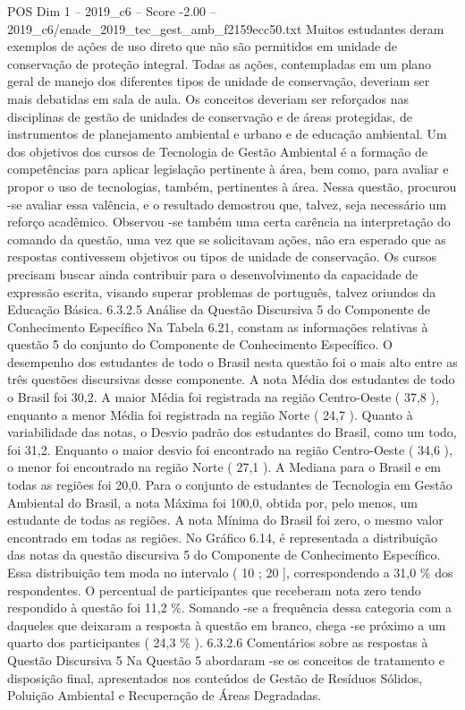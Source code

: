 \begin{textsample}{POS Dim 1 – 2019\_c6 – Score -2.00 – 2019\_c6/enade\_2019\_tec\_gest\_amb\_f2159ecc50.txt}
Muitos estudantes deram exemplos de ações de uso direto que não são permitidos em unidade de conservação de proteção integral.
Todas as ações, contempladas em um plano geral de manejo dos diferentes tipos de unidade de conservação, deveriam ser mais debatidas em sala de aula.
Os conceitos deveriam ser reforçados nas disciplinas de gestão de unidades de conservação e de áreas protegidas, de instrumentos de planejamento ambiental e urbano e de educação ambiental.
Um dos objetivos dos cursos de Tecnologia de Gestão Ambiental é a formação de competências para aplicar legislação pertinente à área, bem como, para avaliar e propor o uso de tecnologias, também, pertinentes à área.
Nessa questão, procurou -se avaliar essa valência, e o resultado demostrou que, talvez, seja necessário um reforço acadêmico.
Observou -se também uma certa carência na interpretação do comando da questão, uma vez que se solicitavam ações, não era esperado que as respostas contivessem objetivos ou tipos de unidade de conservação.
Os cursos precisam buscar ainda contribuir para o desenvolvimento da capacidade de expressão escrita, visando superar problemas de português, talvez oriundos da Educação Básica. 6.3.2.5 Análise da Questão Discursiva 5 do Componente de Conhecimento Específico Na Tabela 6.21, constam as informações relativas à questão 5 do conjunto do Componente de Conhecimento Específico.
O desempenho dos estudantes de todo o Brasil nesta questão foi o mais alto entre as três questões discursivas desse componente.
A nota Média dos estudantes de todo o Brasil foi 30,2.
A maior Média foi registrada na região Centro-Oeste ( 37,8 ), enquanto a menor Média foi registrada na região Norte ( 24,7 ).
Quanto à variabilidade das notas, o Desvio padrão dos estudantes do Brasil, como um todo, foi 31,2.
Enquanto o maior desvio foi encontrado na região Centro-Oeste ( 34,6 ), o menor foi encontrado na região Norte ( 27,1 ).
A Mediana para o Brasil e em todas as regiões foi 20,0.
Para o conjunto de estudantes de Tecnologia em Gestão Ambiental do Brasil, a nota Máxima foi 100,0, obtida por, pelo menos, um estudante de todas as regiões.
A nota Mínima do Brasil foi zero, o mesmo valor encontrado em todas as regiões.
No Gráfico 6.14, é representada a distribuição das notas da questão discursiva 5 do Componente de Conhecimento Específico.
Essa distribuição tem moda no intervalo ( 10 ; 20 ], correspondendo a 31,0 \% dos respondentes.
O percentual de participantes que receberam nota zero tendo respondido à questão foi 11,2 \%.
Somando -se a frequência dessa categoria com a daqueles que deixaram a resposta à questão em branco, chega -se próximo a um quarto dos participantes ( 24,3 \% ). 6.3.2.6 Comentários sobre as respostas à Questão Discursiva 5 Na Questão 5 abordaram -se os conceitos de tratamento e disposição final, apresentados nos conteúdos de Gestão de Resíduos Sólidos, Poluição Ambiental e Recuperação de Áreas Degradadas.

\end{textsample}
